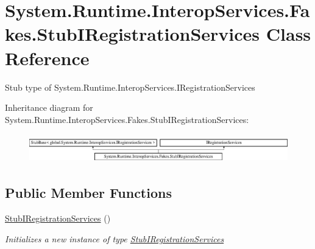 \hypertarget{class_system_1_1_runtime_1_1_interop_services_1_1_fakes_1_1_stub_i_registration_services}{\section{System.\-Runtime.\-Interop\-Services.\-Fakes.\-Stub\-I\-Registration\-Services Class Reference}
\label{class_system_1_1_runtime_1_1_interop_services_1_1_fakes_1_1_stub_i_registration_services}
}


Stub type of System.\-Runtime.\-Interop\-Services.\-I\-Registration\-Services 


Inheritance diagram for System.\-Runtime.\-Interop\-Services.\-Fakes.\-Stub\-I\-Registration\-Services\-:\begin{figure}[H]
\begin{center}
\leavevmode
\includegraphics[height=1.275626cm]{class_system_1_1_runtime_1_1_interop_services_1_1_fakes_1_1_stub_i_registration_services}
\end{center}
\end{figure}
\subsection*{Public Member Functions}
\begin{DoxyCompactItemize}
\item 
\hyperlink{class_system_1_1_runtime_1_1_interop_services_1_1_fakes_1_1_stub_i_registration_services_a5eba9fd5c1acd5c0cbe8f933cee42d5d}{Stub\-I\-Registration\-Services} ()
\begin{DoxyCompactList}\small\item\em Initializes a new instance of type \hyperlink{class_system_1_1_runtime_1_1_interop_services_1_1_fakes_1_1_stub_i_registration_services}{Stub\-I\-Registration\-Services}\end{DoxyCompactList}\end{DoxyCompactItemize}
